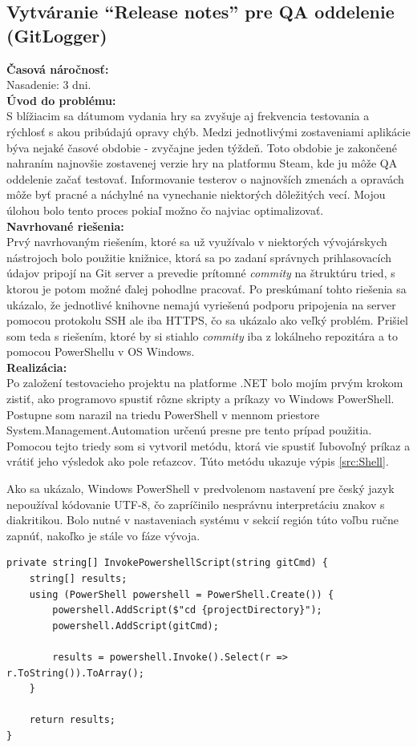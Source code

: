 \documentclass[slovak, bachelorpractice]{diploma}
\begin{document}
\subsection{Vytváranie \enquote{Release notes} pre QA oddelenie (GitLogger)}
\label{sec:GitLogger}
\textbf{Časová náročnosť:} \\ Nasadenie: 3 dni.\\
\textbf{Úvod do problému:} \\ S blížiacim sa dátumom vydania hry sa zvyšuje aj frekvencia testovania a rýchlosť s akou pribúdajú opravy chýb. Medzi jednotlivými zostaveniami aplikácie býva nejaké časové obdobie - zvyčajne jeden týždeň. Toto obdobie je zakončené nahraním najnovšie zostavenej verzie hry na platformu Steam, kde ju môže QA oddelenie začať testovať. Informovanie testerov o najnovších zmenách a opravách môže byť pracné a náchylné na vynechanie niektorých dôležitých vecí. Mojou úlohou bolo tento proces pokiaľ možno čo najviac optimalizovať.\\
\textbf{Navrhované riešenia:} \\ Prvý navrhovaným riešením, ktoré sa už využívalo v niektorých vývojárskych nástrojoch bolo použitie knižnice, ktorá sa po zadaní správnych prihlasovacích údajov pripojí na Git server a prevedie prítomné \textit{commity} na štruktúru tried, s ktorou je potom možné ďalej pohodlne pracovať. Po preskúmaní tohto riešenia sa ukázalo, že jednotlivé knihovne nemajú vyriešenú podporu pripojenia na server pomocou protokolu SSH ale iba HTTPS, čo sa ukázalo ako veľký problém. Prišiel som teda s riešením, ktoré by si stiahlo \textit{commity} iba z lokálneho repozitára a to pomocou PowerShellu v OS Windows.  \\
\textbf{Realizácia:} \\ Po založení testovacieho projektu na platforme .NET bolo mojím prvým krokom zistiť, ako programovo spustiť rôzne skripty a príkazy vo Windows PowerShell. Postupne som narazil na triedu PowerShell v mennom priestore System.Management.Automation určenú presne pre tento prípad použitia. Pomocou tejto triedy som si vytvoril metódu, ktorá vie spustiť ľubovoľný príkaz a vrátiť jeho výsledok ako pole reťazcov. Túto metódu ukazuje výpis \ref{src:Shell}. 

Ako sa ukázalo, Windows PowerShell v predvolenom nastavení pre český jazyk nepoužíval kódovanie UTF-8, čo zapríčinilo nesprávnu interpretáciu znakov s diakritikou. Bolo nutné v nastaveniach systému v sekcií región túto voľbu ručne zapnúť, nakoľko je stále vo fáze vývoja.
\vspace{10pt}
\begin{lstlisting}[label=src:Shell,caption={Metóda InvokePowershellScript triedy GitLogger}]
private string[] InvokePowershellScript(string gitCmd) {
    string[] results;
    using (PowerShell powershell = PowerShell.Create()) {
        powershell.AddScript($"cd {projectDirectory}");
        powershell.AddScript(gitCmd);

        results = powershell.Invoke().Select(r => r.ToString()).ToArray();
    }

    return results;
}
\end{lstlisting}
\end{document}
